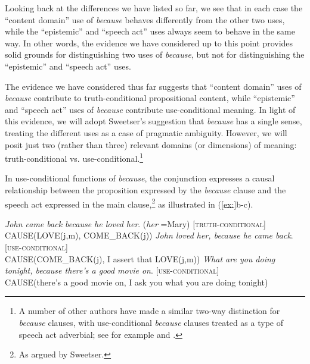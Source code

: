 \ea
{}
\z \z


Looking back at the differences we have listed so far, we see that in each case the “content domain” use of \textit{because} behaves differently from the other two uses, while the “epistemic” and “speech act” uses always seem to behave in the same way. In other words, the evidence we have considered up to this point provides solid grounds for distinguishing two uses of \textit{because}, but not for distinguishing the “epistemic” and “speech act” uses.



The evidence we have considered thus far suggests that “content domain” uses of \textit{because} contribute to truth-conditional propositional content, while “epistemic” and “speech act” uses of \textit{because} contribute use-conditional meaning. In light of this evidence, we will adopt Sweetser’s suggestion that \textit{because} has a single sense, treating the different uses as a case of pragmatic ambiguity. However, we will posit just two (rather than three) relevant domains (or dimensions) of meaning: truth-conditional vs. use-conditional.\footnote{A number of other authors have made a similar two-way distinction for \textit{because} clauses, with use-conditional \textit{because} clauses treated as a type of speech act adverbial; see for example \citet{Scheffler2008,Scheffler2013} and \citet{ThompsonLongacreHwang2007}.} 



In use-conditional functions of \textit{because}, the conjunction expresses a causal relationship between the proposition expressed by the \textit{because} clause and the speech act expressed in the main clause,\footnote{As argued by Sweetser.} as illustrated in (\ref{ex:}b-c).


\ea
\ea \textit{John came back because he loved her}. (\textit{her} =Mary)  [\textsc{truth-conditional}]\\
CAUSE(LOVE(j,m), COME\_BACK(j))
\ex   \textit{John loved her, because he came back}.   [\textsc{use-conditional}]\\
CAUSE(COME\_BACK(j), I assert that LOVE(j,m))
\ex   \textit{What are you doing tonight, because there’s a good movie on}.  [\textsc{use-conditional}]\\
CAUSE(there’s a good movie on, I ask you what you are doing tonight)
\z \z


